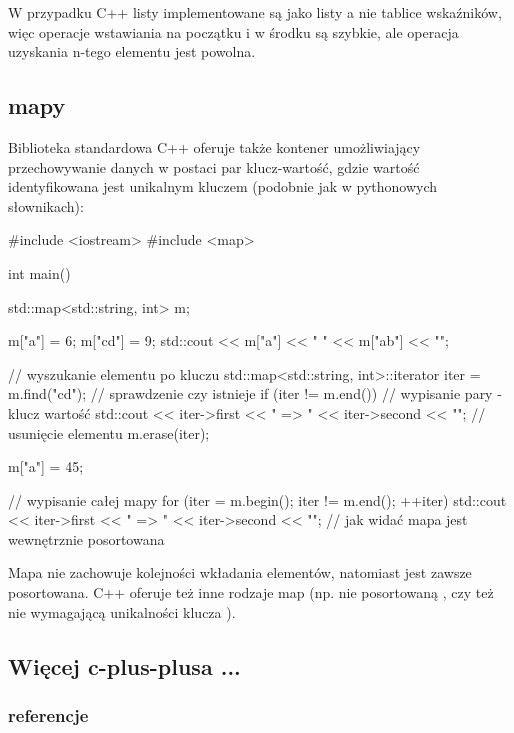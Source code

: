 W przypadku C++ listy implementowane są jako listy a nie tablice wskaźników, więc operacje wstawiania na początku i w środku są szybkie, ale operacja uzyskania n-tego elementu jest powolna.

\subsection{mapy}

Biblioteka standardowa C++ oferuje także kontener umożliwiający przechowywanie danych w postaci par klucz-wartość, gdzie wartość identyfikowana jest unikalnym kluczem (podobnie jak w pythonowych słownikach):

\begin{CodeFrame*}[cpp]{}
#include <iostream>
#include <map>

int main() {
    std::map<std::string, int> m;
    
    m["a"] = 6;
    m["cd"] = 9;
    std::cout << m["a"] << " " << m["ab"] << "\n";
    
    // wyszukanie elementu po kluczu
    std::map<std::string, int>::iterator iter = m.find("cd");
    // sprawdzenie czy istnieje
    if (iter != m.end()) {
        // wypisanie pary - klucz wartość
        std::cout << iter->first << " => " << iter->second << "\n";
        // usunięcie elementu
        m.erase(iter);
    }
    
    m["a"] = 45;
    
    // wypisanie całej mapy
    for (iter = m.begin(); iter != m.end(); ++iter)
        std::cout << iter->first << " => " << iter->second << "\n";
    // jak widać mapa jest wewnętrznie posortowana
}
\end{CodeFrame*}

Mapa  nie zachowuje kolejności wkładania elementów, natomiast jest zawsze posortowana.
C++ oferuje też inne rodzaje map (np. nie posortowaną , czy też nie wymagającą unikalności klucza ).


\subsection{Więcej c-plus-plusa ...}

\subsubsection{referencje}

